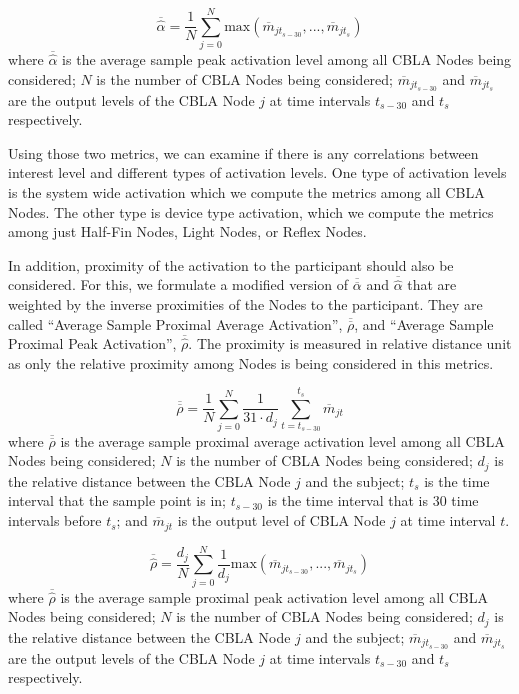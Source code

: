\begin{equation}\label{eqn:bar_hat_alpha}
\overline{\widehat{\alpha}} = \frac{1}{N}\sum_{j=0}^{N} \text{max}(\overline{m}_{jt_{s-30}}, ... , \overline{m}_{jt_{s}})
\end{equation}
where $\overline{\widehat{\alpha}}$ is the average sample peak activation level among all CBLA Nodes being considered; $N$ is the number of CBLA Nodes being considered; $\overline{m}_{jt_{s-30}}$ and $\overline{m}_{jt_s}$ are the output levels of the CBLA Node $j$ at time intervals $t_{s-30}$ and $t_s$ respectively.

Using those two metrics, we can examine if there is any correlations between interest level and different types of activation levels. One type of activation levels is the system wide activation which we compute the metrics among all CBLA Nodes. The other type is device type activation, which we compute the metrics among just Half-Fin Nodes, Light Nodes, or Reflex Nodes. 

In addition, proximity of the activation to the participant should also be considered. For this, we formulate a modified version of $\overline{\overline{\alpha}}$ and $\overline{\widehat{\alpha}}$ that are weighted by the inverse proximities of the Nodes to the participant. They are called ``Average Sample Proximal Average Activation'', $\overline{\overline{\rho}}$, and ``Average Sample Proximal Peak Activation'',  $\overline{\widehat{\rho}}$. The proximity is measured in relative distance unit as only the relative proximity among Nodes is being considered in this metrics. 

\begin{equation}\label{eqn:bar_bar_rho}
\overline{\overline{\rho}} = \frac{1}{N}\sum_{j=0}^{N} \frac{1}{31 \cdot d_j} \sum_{t=t_{s-30}}^{t_{s}}\overline{m}_{jt}
\end{equation}
where $\overline{\overline{\rho}}$ is the average sample proximal average activation level among all CBLA Nodes being considered; $N$ is the number of CBLA Nodes being considered; $d_j$ is the relative distance between the CBLA Node $j$ and the subject; $t_s$ is the time interval that the sample point is in; $t_{s-30}$ is the time interval that is 30 time intervals before $t_s$; and $\overline{m}_{jt}$ is the output level of CBLA Node $j$ at time interval $t$. 

\begin{equation}\label{eqn:bar_hat_rho}
\overline{\widehat{\rho}} = \frac{d_j}{N}\sum_{j=0}^{N} \frac{1}{d_j} \text{max}(\overline{m}_{jt_{s-30}}, ... , \overline{m}_{jt_{s}})
\end{equation}
where $\overline{\widehat{\rho}}$ is the average sample proximal peak activation level among all CBLA Nodes being considered; $N$ is the number of CBLA Nodes being considered; $d_j$ is the relative distance between the CBLA Node $j$ and the subject; $\overline{m}_{jt_{s-30}}$ and $\overline{m}_{jt_{s}}$ are the output levels of the CBLA Node $j$ at time intervals $t_{s-30}$ and $t_s$ respectively.

